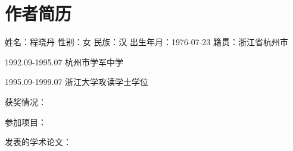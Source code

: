 \chapter*{作者简历}

\setlength{\parindent}{0em}

姓名：程晓丹 \;\; 性别：女 \;\; 民族：汉 \;\; 出生年月：1976-07-23 \;\; 籍贯：浙江省杭州市 \par
1992.09-1995.07 \;\;\;\; 杭州市学军中学 \par
1995.09-1999.07 \;\;\;\; 浙江大学攻读学士学位 \par
获奖情况：  \par
参加项目：  \par
发表的学术论文：  \par
